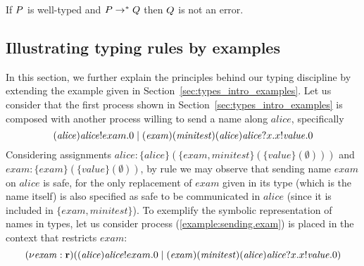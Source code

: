 \begin{corollary}\label{cor:Type_Safety}
If $P$ is well-typed and $P\rightarrow^*Q$ then $Q$ is not an error.
\end{corollary}





\subsection{Illustrating typing rules by examples}\label{sec:examples_after_types}
In this section, we further explain the principles behind our typing discipline by extending the example given in Section~\ref{sec:types_intro_examples}.
Let us consider that the first process shown in Section~\ref{sec:types_intro_examples} is 
composed with another process
 willing to send a name along $\mathit{alice}$, specifically
\begin{equation}\label{example:sending.exam}
(\mathit{alice})\mathit{alice}!exam. 0 \;|\;
(\mathit{exam})(\mathit{minitest})
(\mathit{alice})\mathit{alice}?x.
x!\mathit{value}. 0
\end{equation}
Considering assignments $\mathit{alice} :\{\mathit{alice}\}( \{\mathit{exam}, \mathit{minitest}\} (\{ \mathit{value} \}(\emptyset)))$ and $\mathit{exam}: \{\mathit{exam}\} ( \{\mathit{value}\}(\emptyset) )$, by rule  we may observe that sending name $\mathit{exam}$ on $\mathit{alice}$ is safe, for %
the only replacement of $\mathit{exam}$ given in its type (which is the name itself)  is also specified as safe to be communicated in $\mathit{alice}$ (since it is included in $\{\mathit{exam}, \mathit{minitest}\}$).
%
To exemplify the symbolic representation of names in types, let us consider process (\ref{example:sending.exam}) is placed in the context that 
 restricts $\mathit{exam}$: 
\begin{equation}\label{example:restricted.name}
(\nu \mathit{exam}:{\mathbf{r}})((\mathit{alice})\mathit{alice}!exam. 0 \;|\;
(\mathit{exam})(\mathit{minitest})
(\mathit{alice})\mathit{alice}?x.
x!\mathit{value}. 0)
\end{equation}
